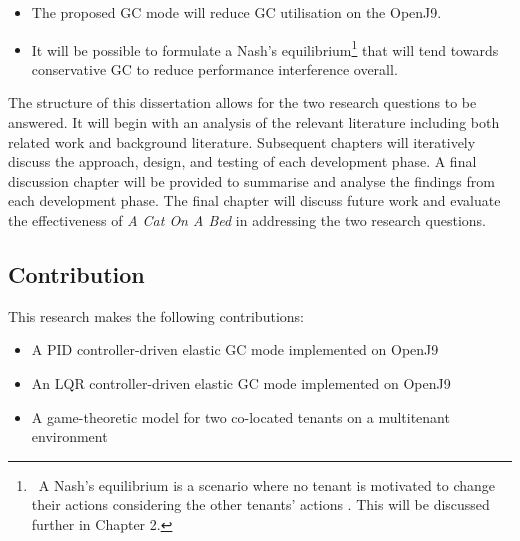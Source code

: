 \begin{itemize}
\item
  The proposed GC mode will reduce GC utilisation on the OpenJ9.
\item
  It will be possible to formulate a Nash's equilibrium\footnote{~A
    Nash's equilibrium is a scenario where no tenant is motivated to
    change their actions considering the other tenants' actions
    \cite{benslama2015game}. This will be discussed
    further in Chapter 2.} that will tend towards conservative GC to
  reduce performance interference overall.
\end{itemize}
The structure of this dissertation allows for the two research questions
to be answered. It will begin with an analysis of the relevant
literature including both related work and background literature.
Subsequent chapters will iteratively discuss the approach, design, and
testing of each development phase. A final discussion chapter will be
provided to summarise and analyse the findings from each development
phase. The final chapter will discuss future work and evaluate the
effectiveness of \emph{A Cat On A Bed} in addressing the two research
questions.
\subsection{Contribution}
This research makes the following contributions:
\begin{itemize}
\item
  A PID controller-driven elastic GC mode implemented on OpenJ9
\item
  An LQR controller-driven elastic GC mode implemented on OpenJ9
\item
  A game-theoretic model for two co-located tenants on a multitenant
  environment
\end{itemize}

